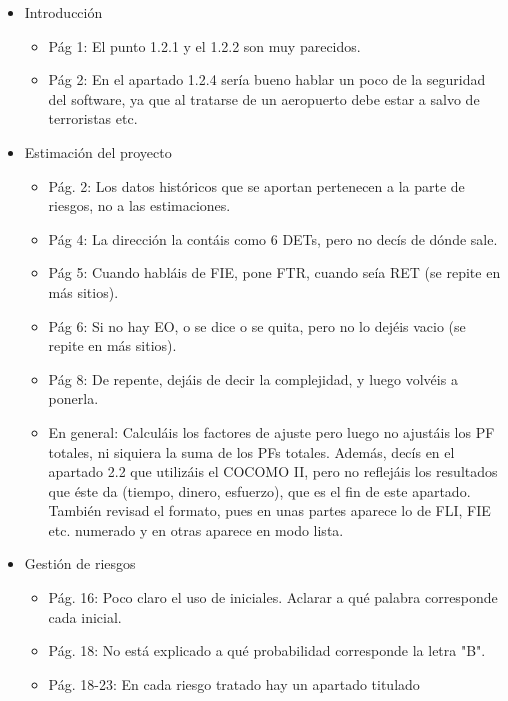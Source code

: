 \documentclass[11pt, a4paper, twoside, titlepage]{article}
\begin{document}
\begin{itemize}
\begin{itemize}
\begin{itemize}
							\item Introducción
								\begin{itemize}
								\item Pág  1:  El  punto  1.2.1  y  el  1.2.2  son  muy  parecidos.  
								\item Pág  2:  En  el  apartado  1.2.4  sería  bueno  hablar  un  poco  de  la  
seguridad  del  software,  ya  que  al  tratarse  de  un  aeropuerto  debe   estar  a  salvo  de  terroristas  etc.  
								\end{itemize}
							\item Estimación del proyecto
								\begin{itemize}
								\item Pág.  2:  Los  datos  históricos  que  se  aportan  pertenecen  a  la  parte  de   riesgos,  no  a  las  estimaciones.   
								\item Pág  4:  La  dirección  la  contáis  como  6  DETs,  pero  no  decís  de dónde sale.  	
								\item Pág  5:  Cuando  habláis  de  FIE,  pone  FTR,  cuando  seía  RET  (se  repite  en  más  sitios).  
								\item Pág  6:  Si  no  hay  EO,  o  se  dice  o  se  quita,  pero  no  lo  dejéis  vacio  (se  repite  en  más  sitios).   
								\item Pág  8:  De  repente,  dejáis  de  decir  la  complejidad,  y  luego  volvéis  a  
ponerla.  
								\item En general: 
								Calculáis  los  factores  de  ajuste  pero  luego  no  ajustáis  los  PF  totales,  ni   siquiera  la  suma  de  los  PFs  totales.  Además,  decís  en  el  apartado  2.2   que  utilizáis  el  COCOMO  II,  pero  no  reflejáis  los  resultados  que  éste   da  (tiempo,  dinero,  esfuerzo),  que  es  el  fin  de  este  apartado.  También   revisad  el  formato,  pues  en  unas  partes  aparece  lo  de  FLI,  FIE  etc.   numerado  y  en  otras  aparece  en  modo  lista.  
								\end{itemize}
							\item Gestión de riesgos
								\begin{itemize}
								\item Pág.  16:  Poco  claro  el  uso  de  iniciales.  Aclarar  a  qué  palabra   corresponde  cada  inicial.  
								\item Pág.  18:  No  está  explicado  a  qué  probabilidad  corresponde  la  letra  
"B".  
								\item Pág.  18-23:  En  cada  riesgo  tratado  hay  un  apartado  titulado  

\end{itemize}
\end{itemize}
\end{itemize}
\end{itemize}
\end{document}
